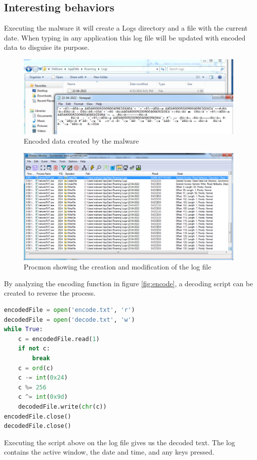 \documentclass{article}
\begin{document}
    \subsection{Interesting behaviors}
    Executing the malware it will create a Logs directory and a file with the current date. When typing in any application this log file will be updated with encoded data to disguise its purpose.
    \begin{figure}[H]
        \includegraphics[width=\textwidth]{encoded-logs.png}
        \caption{Encoded data created by the malware}
    \end{figure}
    \begin{figure}[H]
        \includegraphics[width=\textwidth]{procmon-logs.png}
        \caption{Procmon showing the creation and modification of the log file}
    \end{figure}
    \pagebreak
    By analyzing the encoding function in figure \ref{fig:encode}, a decoding script can be created to reverse the process.
    \begin{lstlisting}[language=Python]
encodedFile = open('encode.txt', 'r')
decodedFile = open('decode.txt', 'w')
while True:
    c = encodedFile.read(1)
    if not c:
        break
    c = ord(c)
    c -= int(0x24)
    c %= 256
    c ^= int(0x9d)
    decodedFile.write(chr(c))
encodedFile.close()
decodedFile.close()
    \end{lstlisting}
    Executing the script above on the log file gives us the decoded text.     The log contains the active window, the date and time, and any keys pressed.
\end{document}
